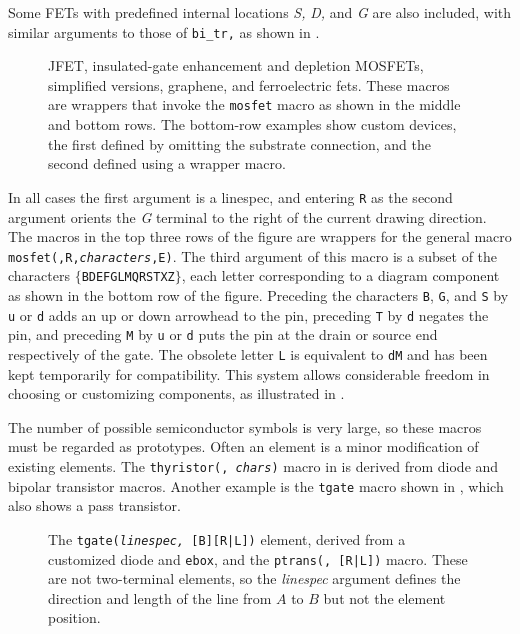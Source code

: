 \enlargethispage{\baselineskip}
Some FETs with predefined internal locations {\sl S,} {\sl D,} and {\sl G} are
also included, with similar arguments to those of {\tt bi\_tr,} as shown in
.
\begin{figure}[ht]
\vspace*{-\baselineskip}
   
   \caption{JFET, insulated-gate enhancement and depletion MOSFETs,
     simplified versions, graphene, and ferroelectric fets. 
     These macros are wrappers that invoke the {\tt mosfet}
     macro as shown in the middle and bottom rows.
     The bottom-row examples show custom devices, the first
     defined by omitting the substrate connection, and the second
     defined using a wrapper macro.}
   \label{fet}
   \end{figure}
In all cases the first argument is a linespec,
and entering
{\tt R} as the second argument orients the {\sl G} terminal to the right of the
current drawing direction.
The macros in the top three rows of the figure are wrappers for the
general macro {\tt mosfet(\linespec,R,{\sl characters},E)}.
The third argument of this macro is a subset of the characters
$\{${\tt BDEFGLMQRSTXZ}$\}$, each letter corresponding to
a diagram component as shown in the bottom row of the figure. 
Preceding the characters {\tt B}, {\tt G}, and {\tt S} by {\tt u} or {\tt d}
adds an up or down arrowhead to the pin, preceding {\tt T} by {\tt d}
negates the pin, and preceding {\tt M} by {\tt u} or {\tt d} puts the pin
at the drain or source end respectively of the gate.
The obsolete letter {\tt L} is equivalent to {\tt dM} and has been kept
temporarily for compatibility.
This system allows considerable freedom in choosing or customizing components,
as illustrated in .

\enlargethispage{\baselineskip}
The number of possible semiconductor symbols is very
large, so these macros must be regarded as prototypes.
Often an element is a minor modification of existing elements.
The {\tt thyristor(\linespec, {\sl chars})} macro in
 is derived from diode and bipolar transistor macros.
Another example is the {\tt tgate} macro shown in , which
also shows a pass transistor.
\begin{figure}[H]
   
   \caption{The {\tt tgate({\sl linespec,} [B][R|L])} element, derived from
     a customized diode and {\tt ebox}, and the
     {\tt ptrans(\linespec, [R|L])} macro.
     These are not two-terminal elements, so the {\sl linespec} argument
     defines the direction and length of the line from $A$ to $B$ but not
     the element position.}
   \label{Tgate}
   \end{figure}

